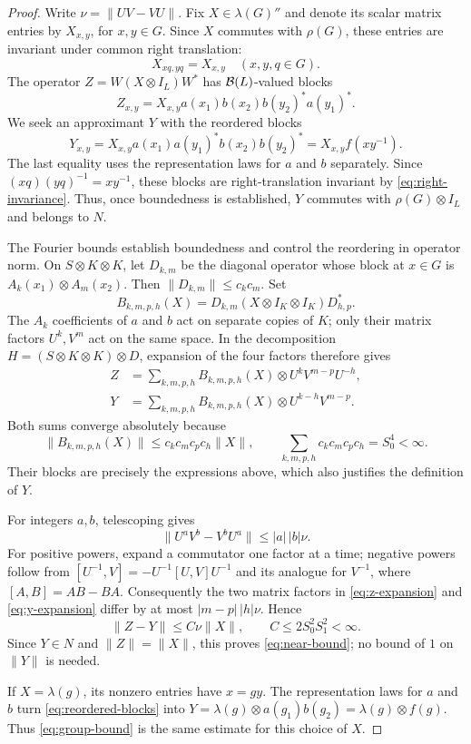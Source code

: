 \begin{proof}
Write $\nu=\|UV-VU\|$. Fix $X\in\lambda(G)''$ and denote its
scalar matrix entries by $X_{x,y}$, for $x,y\in G$. Since $X$
commutes with $\rho(G)$, these entries are invariant under common
right translation:
\begin{equation}\label{eq:right-invariance}
 X_{xq,yq}=X_{x,y}\quad(x,y,q\in G).
\end{equation}
The operator $Z=W(X\otimes I_L)W^*$ has $\mathcal B(L)$-valued blocks
\[
 Z_{x,y}=X_{x,y}a(x_1)b(x_2)b(y_2)^*a(y_1)^*.
\]
We seek an approximant $Y$ with the reordered blocks
\begin{equation}\label{eq:reordered-blocks}
 Y_{x,y}=X_{x,y}a(x_1)a(y_1)^*b(x_2)b(y_2)^*
        =X_{x,y}f(xy^{-1}).
\end{equation}
The last equality uses the representation laws for $a$ and $b$
separately. Since $(xq)(yq)^{-1}=xy^{-1}$, these blocks are
right-translation invariant by \eqref{eq:right-invariance}.
Thus, once boundedness is established,
$Y$ commutes with $\rho(G)\otimes I_L$ and belongs to $N$.

The Fourier bounds establish boundedness and control the reordering
in operator norm. On $S\otimes K\otimes K$, let $D_{k,m}$ be
the diagonal operator whose block at $x\in G$ is
$A_k(x_1)\otimes A_m(x_2)$. Then $\|D_{k,m}\|\leq c_kc_m$.
Set
\[
 B_{k,m,p,h}(X)=
 D_{k,m}(X\otimes I_K\otimes I_K)D_{h,p}^*.
\]
The $A_k$ coefficients of $a$ and $b$ act on separate copies of $K$;
only their matrix factors $U^k,V^m$ act on the same space. In the
decomposition $H=(S\otimes K\otimes K)\otimes D$, expansion of the
four factors therefore gives
\begin{align}
 Z&=\sum_{k,m,p,h} B_{k,m,p,h}(X)
                   \otimes U^kV^{m-p}U^{-h},
 \label{eq:z-expansion}\\
 Y&=\sum_{k,m,p,h} B_{k,m,p,h}(X)
                   \otimes U^{k-h}V^{m-p}.
 \label{eq:y-expansion}
\end{align}
Both sums converge absolutely because
\[
 \|B_{k,m,p,h}(X)\|
       \leq c_kc_mc_pc_h\|X\|,
 \qquad \sum_{k,m,p,h}c_kc_mc_pc_h=S_0^4<\infty.
\]
Their blocks are precisely the expressions above, which also
justifies the definition of $Y$.

For integers $a,b$, telescoping gives
\begin{equation}\label{eq:power-commutator}
 \|U^aV^b-V^bU^a\|\leq |a|\,|b|\nu.
\end{equation}
For positive powers, expand a commutator one factor at a time;
negative powers follow from
$[U^{-1},V]=-U^{-1}[U,V]U^{-1}$ and its analogue for $V^{-1}$,
where $[A,B]=AB-BA$. Consequently the two matrix factors in
\eqref{eq:z-expansion} and \eqref{eq:y-expansion} differ by at most
$|m-p|\,|h|\nu$. Hence
\begin{equation}\label{eq:reordering-estimate}
 \|Z-Y\|\leq C\nu\|X\|,
 \qquad C\leq 2S_0^2S_1^2<\infty.
\end{equation}
Since $Y\in N$ and $\|Z\|=\|X\|$, this proves
\eqref{eq:near-bound}; no bound of $1$ on $\|Y\|$ is needed.

If $X=\lambda(g)$, its nonzero entries have $x=gy$. The
representation laws for $a$ and $b$ turn
\eqref{eq:reordered-blocks} into
$Y=\lambda(g)\otimes a(g_1)b(g_2)=\lambda(g)\otimes f(g)$.
Thus \eqref{eq:group-bound} is the same estimate for this choice of $X$.
\end{proof}
